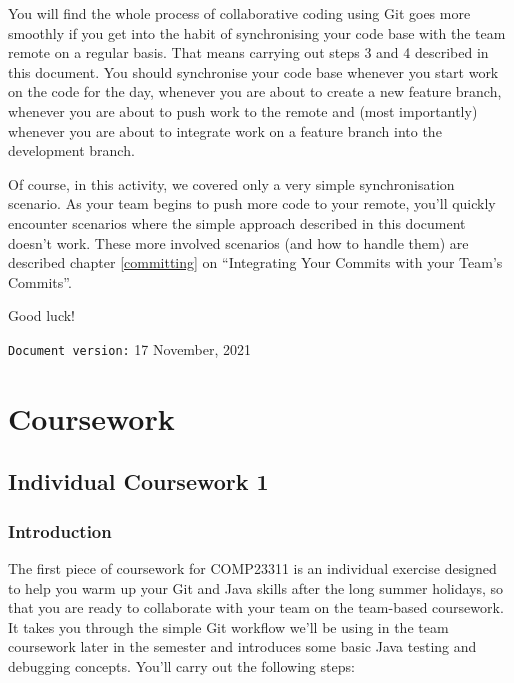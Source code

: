 \documentclass[
]{book}
\begin{document}
You will find the whole process of collaborative coding using Git goes more smoothly if you get into the habit of synchronising your code base with the team remote on a regular basis. That means carrying out steps 3 and 4 described in this document. You should synchronise your code base whenever you start work on the code for the day, whenever you are about to create a new feature branch, whenever you are about to push work to the remote and (most importantly) whenever you are about to integrate work on a feature branch into the development branch.

Of course, in this activity, we covered only a very simple synchronisation scenario. As your team begins to push more code to your remote, you'll quickly encounter scenarios where the simple approach described in this document doesn't work. These more involved scenarios (and how to handle them) are described chapter \ref{committing} on ``Integrating Your Commits with your Team's Commits''.

Good luck!

\texttt{Document\ version:} 17 November, 2021

\hypertarget{part-coursework}{%
\part{Coursework}\label{part-coursework}}

\hypertarget{gitting}{%
\chapter{Individual Coursework 1}\label{gitting}}

\hypertarget{introcw1}{%
\section{Introduction}\label{introcw1}}

The first piece of coursework for COMP23311 is an individual exercise designed to help you warm up your Git and Java skills after the long summer holidays, so that you are ready to collaborate with your team on the team-based coursework. It takes you through the simple Git workflow we'll be using in the team coursework later in the semester and introduces some basic Java testing and debugging concepts. You'll carry out the following steps:
\end{document}
